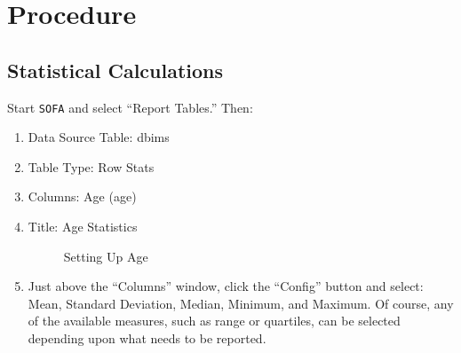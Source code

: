 \section{Procedure}

\subsection{Statistical Calculations}
\label{dis:statistical_calculations}

Start \texttt{SOFA} and select ``Report Tables.'' Then:

\begin{enumerate}
  \item Data Source Table: dbims
  \item Table Type: Row Stats
  \item Columns: Age (age)
  \item Title: Age Statistics
  
  \begin{figure}[H]
      \begin{center}
          \caption{Setting Up Age}
        \end{center}
  \end{figure}
    
  \item Just above the ``Columns'' window, click the ``Config'' button and select: Mean, Standard Deviation, Median, Minimum, and Maximum. Of course, any of the available measures, such as range or quartiles, can be selected depending upon what needs to be reported.
    

\end{enumerate}
